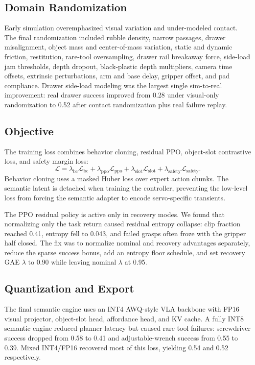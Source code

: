 \documentclass[10pt,twocolumn]{article}
\begin{document}
\subsection{Domain Randomization}

Early simulation overemphasized visual variation and under-modeled contact. The final randomization included rubble density, narrow passages, drawer misalignment, object mass and center-of-mass variation, static and dynamic friction, restitution, rare-tool oversampling, drawer rail breakaway force, side-load jam thresholds, depth dropout, black-plastic depth multipliers, camera time offsets, extrinsic perturbations, arm and base delay, gripper offset, and pad compliance. Drawer side-load modeling was the largest single sim-to-real improvement: real drawer success improved from 0.28 under visual-only randomization to 0.52 after contact randomization plus real failure replay.

\subsection{Objective}

The training loss combines behavior cloning, residual PPO, object-slot contrastive loss, and safety margin loss:
\[
\mathcal{L} =
\lambda_{\mathrm{bc}}\mathcal{L}_{\mathrm{bc}}
+ \lambda_{\mathrm{ppo}}\mathcal{L}_{\mathrm{ppo}}
+ \lambda_{\mathrm{slot}}\mathcal{L}_{\mathrm{slot}}
+ \lambda_{\mathrm{safety}}\mathcal{L}_{\mathrm{safety}}.
\]
Behavior cloning uses a masked Huber loss over expert action chunks. The semantic latent is detached when training the controller, preventing the low-level loss from forcing the semantic adapter to encode servo-specific transients.

The PPO residual policy is active only in recovery modes. We found that normalizing only the task return caused residual entropy collapse: clip fraction reached 0.41, entropy fell to 0.043, and failed grasps often froze with the gripper half closed. The fix was to normalize nominal and recovery advantages separately, reduce the sparse success bonus, add an entropy floor schedule, and set recovery GAE $\lambda$ to 0.90 while leaving nominal $\lambda$ at 0.95.

\subsection{Quantization and Export}

The final semantic engine uses an INT4 AWQ-style VLA backbone with FP16 visual projector, object-slot head, affordance head, and KV cache. A fully INT8 semantic engine reduced planner latency but caused rare-tool failures: screwdriver success dropped from 0.58 to 0.41 and adjustable-wrench success from 0.55 to 0.39. Mixed INT4/FP16 recovered most of this loss, yielding 0.54 and 0.52 respectively.
\end{document}
